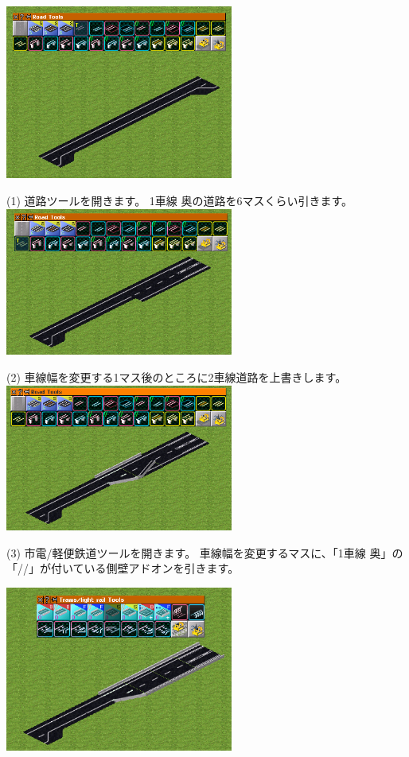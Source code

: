 \documentclass{jarticle}
\begin{document}
\begin{multicols}{2}


\includegraphics[width = 75mm]{picture/20210214-road-5-1.png}

(1)
道路ツールを開きます。
1車線 奥の道路を6マスくらい引きます。\\


\includegraphics[width = 75mm]{picture/20210214-road-5-2.png}

(2)
車線幅を変更する1マス後のところに2車線道路を上書きします。\\


\includegraphics[width = 75mm]{picture/20210214-road-5-3.png}

(3)
市電/軽便鉄道ツールを開きます。
車線幅を変更するマスに、「1車線 奥」の「//」が付いている側壁アドオンを引きます。




\includegraphics[width = 75mm]{picture/20210214-road-5-4.png}


\end{multicols}
\end{document}
